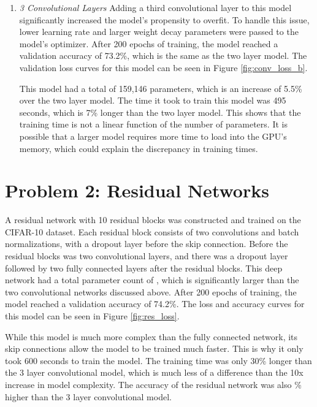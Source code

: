 \documentclass{article}
\begin{document}
\begin{enumerate}[label=\alph*. ]
     \item \textit{3 Convolutional Layers}
     Adding a third convolutional layer to this model significantly increased the model's propensity to overfit. To handle this issue, lower learning rate and larger weight decay parameters were passed to the model's optimizer. After 200 epochs of training, the model reached a validation accuracy of 73.2\%, which is the same as the two layer model. The validation loss curves for this model can be seen in Figure \ref{fig:conv_loss_b}.

     This model had a total of 159,146 parameters, which is an increase of 5.5\% over the two layer model. The time it took to train this model was 495 seconds, which is 7\% longer than the two layer model. This shows that the training time is not a linear function of the number of parameters. It is possible that a larger model requires more time to load into the GPU's memory, which could explain the discrepancy in training times.

\end{enumerate}
\section{Problem 2: Residual Networks}
A residual network with 10 residual blocks was constructed and trained on the CIFAR-10 dataset. Each residual block consists of two convolutions and batch normalizations, with a dropout layer before the skip connection. Before the residual blocks was two convolutional layers, and there was a dropout layer followed by two fully connected layers after the residual blocks. This deep network had a total parameter count of , which is significantly larger than the two convolutional networks discussed above. After 200 epochs of training, the model reached a validation accuracy of 74.2\%. The loss and accuracy curves for this model can be seen in Figure \ref{fig:res_loss}.

While this model is much more complex than the fully connected network, its skip connections allow the model to be trained much faster. This is why it only took 600 seconds to train the model. The training time was only 30\% longer than the 3 layer convolutional model, which is much less of a difference than the 10x increase in model complexity. The accuracy of the residual network was also \% higher than the 3 layer convolutional model.
\end{document}
